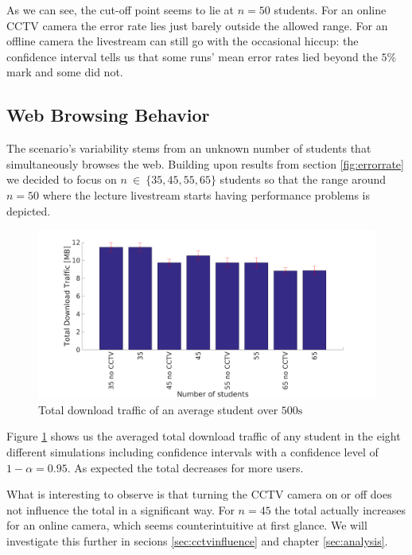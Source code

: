 \documentclass[a4paper]{scrreprt}
\begin{document}
			As we can see, the cut-off point seems to lie at $n=50$ students. For an online CCTV camera the error rate lies just barely outside the allowed range. For an offline camera the livestream can still go with the occasional hiccup: the confidence interval tells us that some runs' mean error rates lied beyond the $5\%$ mark and some did not.							
		
		\subsection{Web Browsing Behavior}\label{sec:http}
			The scenario's variability stems from an unknown number of students that simultaneously browses the web. Building upon results from section \ref{fig:errorrate} we decided to focus on $n~\in~\{35, 45, 55, 65\}$ students so that the range around $n=50$ where the lecture livestream starts having performance problems is depicted.
			
			\begin{figure}[H]
				\center\includegraphics[width=\textwidth]{../Results_Analysis/HTTP/http.png}
				\caption{Total download traffic of an average student over $500\text{s}$}
				\label{fig:http}
			\end{figure}
			
			Figure \ref{fig:http} shows us the averaged total download traffic of any student in the eight different simulations including confidence intervals with a confidence level of $1-\alpha = 0.95$. As expected the total decreases for more users.
			
			What is interesting to observe is that turning the CCTV camera on or off does not influence the total in a significant way. For $n=45$ the total actually increases for an online camera, which seems counterintuitive at first glance. We will investigate this further in secions \ref{sec:cctvinfluence} and chapter \ref{sec:analysis}.		
			
\end{document}
